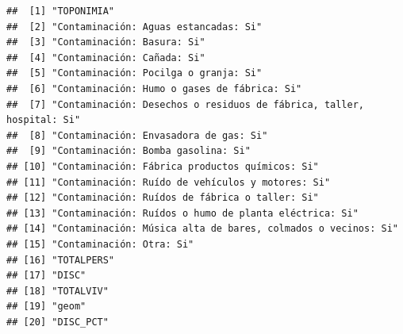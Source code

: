 \documentclass[11pt,]{article}
\begin{document}
\begin{verbatim}
##  [1] "TOPONIMIA"                                                          
##  [2] "Contaminación: Aguas estancadas: Si"                                
##  [3] "Contaminación: Basura: Si"                                          
##  [4] "Contaminación: Cañada: Si"                                          
##  [5] "Contaminación: Pocilga o granja: Si"                                
##  [6] "Contaminación: Humo o gases de fábrica: Si"                         
##  [7] "Contaminación: Desechos o residuos de fábrica, taller, hospital: Si"
##  [8] "Contaminación: Envasadora de gas: Si"                               
##  [9] "Contaminación: Bomba gasolina: Si"                                  
## [10] "Contaminación: Fábrica productos químicos: Si"                      
## [11] "Contaminación: Ruído de vehículos y motores: Si"                    
## [12] "Contaminación: Ruídos de fábrica o taller: Si"                      
## [13] "Contaminación: Ruídos o humo de planta eléctrica: Si"               
## [14] "Contaminación: Música alta de bares, colmados o vecinos: Si"        
## [15] "Contaminación: Otra: Si"                                            
## [16] "TOTALPERS"                                                          
## [17] "DISC"                                                               
## [18] "TOTALVIV"                                                           
## [19] "geom"                                                               
## [20] "DISC_PCT"
\end{verbatim}
\end{document}
